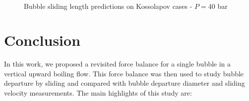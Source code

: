 \begin{figure}[h!]
\begin{center}
\\
\\
	\caption{Bubble sliding length predictions on Kossolapov cases - $P=40$ bar}	
	\label{fig:slide_koss_40bar}
\end{center}
\end{figure}




\section{Conclusion}\label{ccl}

In this work, we proposed a revisited force balance for a single bubble in a vertical upward boiling flow. This force balance was then used to study bubble departure by sliding and compared with bubble departure diameter and sliding velocity measurements. The main highlights of this study are:

